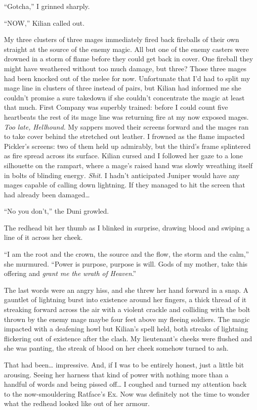\documentclass[12pt, openany]{book}
\begin{document}
“Gotcha,” I grinned sharply.

“NOW,” Kilian called out.

My three clusters of three mages immediately fired back fireballs of their own straight at the source of the enemy magic. All but one of the enemy casters were drowned in a storm of flame before they could get back in cover. One fireball they might have weathered without too much damage, but three? Those three mages had been knocked out of the melee for now. Unfortunate that I’d had to split my mage line in clusters of three instead of pairs, but Kilian had informed me she couldn’t promise a sure takedown if she couldn’t concentrate the magic at least that much. First Company was superbly trained: before I could count five heartbeats the rest of its mage line was returning fire at my now exposed mages. \textit{Too late, Hellhound.} My sappers moved their screens forward and the mages ran to take cover behind the stretched out leather. I frowned as the flame impacted Pickler’s screens: two of them held up admirably, but the third’s frame splintered as fire spread across its surface. Kilian cursed and I followed her gaze to a lone silhouette on the rampart, where a mage’s raised hand was slowly wreathing itself in bolts of blinding energy\textit{. Shit.} I hadn’t anticipated Juniper would have any mages capable of calling down lightning. If they managed to hit the screen that had already been damaged…

“No you don’t,” the Duni growled.

The redhead bit her thumb as I blinked in surprise, drawing blood and swiping a line of it across her cheek.

“I am the root and the crown, the source and the flow, the storm and the calm,” she murmured. “Power is purpose, purpose is will. Gods of my mother, take this offering and \textit{grant me the wrath of Heaven}.”

The last words were an angry hiss, and she threw her hand forward in a snap. A gauntlet of lightning burst into existence around her fingers, a thick thread of it streaking forward across the air with a violent crackle and colliding with the bolt thrown by the enemy mage maybe four feet above my fleeing soldiers. The magic impacted with a deafening howl but Kilian’s spell held, both streaks of lightning flickering out of existence after the clash. My lieutenant’s cheeks were flushed and she was panting, the streak of blood on her cheek somehow turned to ash.

That had been… impressive. And, if I was to be entirely honest, just a little bit arousing. Seeing her harness that kind of power with nothing more than a handful of words and being pissed off… I coughed and turned my attention back to the now-smouldering Ratface’s Ex. Now was definitely not the time to wonder what the redhead looked like out of her armour.
\end{document}
